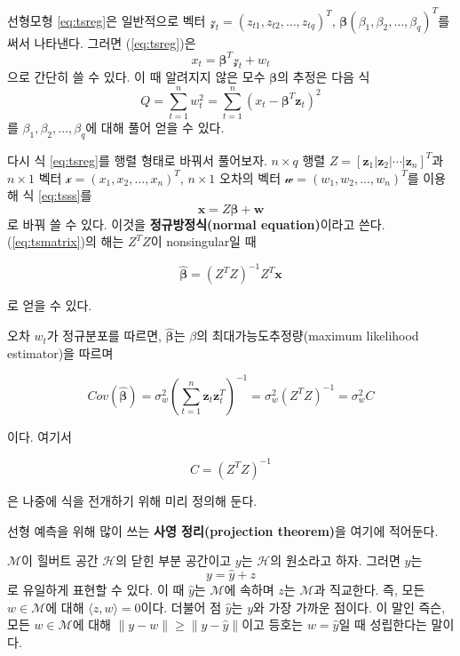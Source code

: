 \documentclass[b5paper,]{scrbook}
\theoremstyle{plain}
\theoremstyle{definition}
\numberwithin{equation}{section}
\let\BeginKnitrBlock\begin \let\EndKnitrBlock\end
\begin{document}
선형모형 \eqref{eq:tsreg}은 일반적으로 벡터 \(\mathcal{z}_{t}=(z_{t1},z_{t2},\ldots , z_{tq})^{T}\), \(\boldsymbol{\beta}(\beta_{1},\beta_{2},\ldots ,\beta_{q})^{T}\)를 써서 나타낸다. 그러면 (\eqref{eq:tsreg})은
\begin{equation}
x_{t}=\boldsymbol{\beta}^{T}\mathcal{z}_{t}+w_{t}
\label{eq:tsregvec}
\end{equation}
으로 간단히 쓸 수 있다. 이 때 알려지지 않은 모수 \(\boldsymbol{\beta}\)의 추정은 다음 식
\begin{equation}
Q=\sum_{t=1}^{n}w_{t}^{2}=\sum_{t=1}^{n}(x_{t}-\boldsymbol{\beta}^{T}\mathbf{z}_{t})^{2}
\label{eq:tsss}
\end{equation}
를 \(\beta_{1},\beta_{2},\ldots ,\beta_{q}\)에 대해 풀어 얻을 수 있다.

다시 식 \eqref{eq:tsreg}를 행렬 형태로 바꿔서 풀어보자. \(n\times q\) 행렬 \(Z= [\mathbf{z}_{1} | \mathbf{z}_{2} | \cdots | \mathbf{z}_{n} ]^{T}\)과 \(n \times 1\) 벡터 \(\mathcal{x}=(x_{1},x_{2},\ldots , x_{n})^{T}\), \(n \times 1\) 오차의 벡터 \(\mathcal{w}=(w_{1},w_{2}, \ldots, w_{n})^{T}\)를 이용해 식 \eqref{eq:tsss}를
\begin{equation}
\mathbf{x}=Z\boldsymbol{\beta}+\mathbf{w}
\label{eq:tsmatrix}
\end{equation}
로 바꿔 쓸 수 있다. 이것을 \textbf{정규방정식(normal equation)}이라고 쓴다. (\eqref{eq:tsmatrix})의 해는 \(Z^{T}Z\)이 nonsingular일 때

\[\hat{\boldsymbol{\beta}}=(Z^{T}Z)^{-1}Z^{T}\mathbf{x}\]

로 얻을 수 있다.

오차 \(w_{t}\)가 정규분포를 따르면, \(\hat{\boldsymbol{\beta}}\)는 \(\beta\)의 최대가능도추정량(maximum likelihood estimator)을 따르며

\[Cov(\hat{\boldsymbol{\beta}})=\sigma_{w}^{2}(\sum_{t=1}^{n}\mathbf{z}_{t}\mathbf{z}_{t}^{T})^{-1}=\sigma_{w}^{2}(Z^{T}Z)^{-1}=\sigma_{w}^{2}C\]

이다. 여기서

\[C=(Z^{T}Z)^{-1}\]

은 나중에 식을 전개하기 위해 미리 정의해 둔다.

선형 예측을 위해 많이 쓰는 \textbf{사영 정리(projection theorem)}을 여기에 적어둔다.

\BeginKnitrBlock{theorem}[사영 정리]
\protect\hypertarget{thm:projectiontheorem}{}{\label{thm:projectiontheorem} {} }\(\mathcal{M}\)이 힐버트 공간 \(\mathcal{H}\)의 닫힌 부분 공간이고 \(y\)는 \(\mathcal{H}\)의 원소라고 하자. 그러면 \(y\)는
\begin{equation}
y=\hat{y}+z
\end{equation}
로 유일하게 표현할 수 있다. 이 때 \(\hat{y}\)는 \(\mathcal{M}\)에 속하며 \(z\)는 \(\mathcal{M}\)과 직교한다. 즉, 모든 \(w\in\mathcal{M}\)에 대해 \(\langle z,w \rangle=0\)이다. 더불어 점 \(\hat{y}\)는 \(y\)와 가장 가까운 점이다. 이 말인 즉슨, 모든 \(w\in\mathcal{M}\)에 대해 \(\| y-w\|\geq \|y-\hat{y}\|\)이고 등호는 \(w=\hat{y}\)일 때 성립한다는 말이다.
\EndKnitrBlock{theorem}
\end{document}
